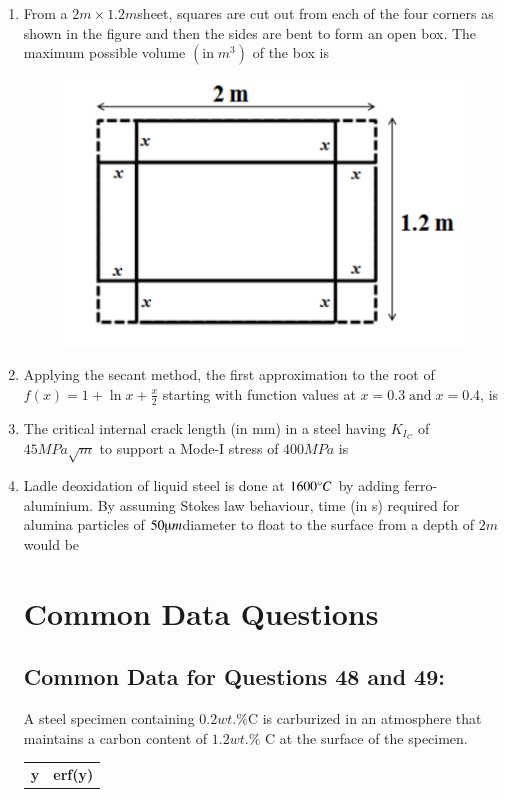 \documentclass[journal]{IEEEtran}
\theoremstyle{remark}
\begin{document}
\begin{enumerate}
\item From a $2 m \times 1.2 m $sheet, squares are cut out from each of the four corners as shown in the figure and then the sides are bent to form an open box. The maximum possible volume $(\text{in}\; m^3 )$ of the box is \underline {\hspace{2cm}} \hfill{}\\

\begin{figure}[H]
    \centering
    \includegraphics[width=0.5\columnwidth]{figs/Q.44.png}
    \caption{}
    \label{fig:placeholder}
\end{figure}


	\item  Applying the secant method, the first approximation to the root of $f(x)=1+\ln{x}+\frac{x}{2}$ starting
with function values at $x = 0.3\; \text{and}\; x=0.4$, is \underline {\hspace{2cm}}
    \hfill{}\\


\item  The critical internal crack length (in mm) in a steel having $K_{I_C}$ of $45MPa\sqrt{m}$ to support a Mode-I stress of $400 MPa$ is \underline {\hspace{2cm}}
 \hfill{}


\item  Ladle deoxidation of liquid steel is done at $1600\degree C$ by adding ferro-aluminium. By assuming Stokes law behaviour, time (in s) required for alumina particles of $50\micro m$diameter to float to the surface from a depth of $2 m$ would be \underline {\hspace{2cm}}
\hfill{}
\section*{Common Data Questions }
\subsection*{Common Data for Questions 48 and 49: }
A steel specimen containing $0.2 wt.\%$C is carburized in an atmosphere that maintains a carbon content of $1.2 wt.\%$ C at the surface of the specimen.
\begin{center}
\begin{tabular}{|c|c|}
\hline
\textbf{y} & \textbf{erf(y)} \\


\end{tabular}
\end{center}
\end{enumerate}
\end{document}
